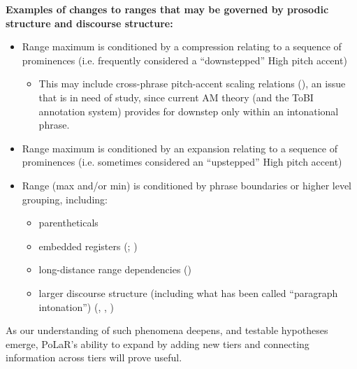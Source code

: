 \documentclass[11pt, twoside]{memoir}
\begin{document}
\textbf{Examples of changes to ranges that may be governed by prosodic structure and discourse structure:}
\begin{itemize}
	\item Range maximum is conditioned by a compression relating to a sequence of prominences (i.e. frequently considered a “downstepped” High pitch accent) 
	\begin{itemize}
		\item This may include cross-phrase pitch-accent scaling relations (\citealt{fery-05}), an issue that is in need of study, since current AM theory (and the ToBI annotation system) provides for downstep only within an intonational phrase. 
	\end{itemize}
	\item Range maximum is conditioned by an expansion relating to a sequence of prominences (i.e. sometimes considered an “upstepped” High pitch accent) 
	\item Range (max and/or min) is conditioned by phrase boundaries or higher level grouping, including:
	\begin{itemize}
		\item parentheticals
		\item embedded registers (\citealt{truckenbrodt02}; \citealt{dimperio-10})
		\item long-distance range dependencies (\citealt{ladd88})
		\item larger discourse structure (including what has been called “paragraph intonation”) (\citealt{lehiste75}, \citealt{sluijter-93}, \citealt{wichmann14})
	\end{itemize}
\end{itemize}

As our understanding of such phenomena deepens, and testable hypotheses emerge, PoLaR’s ability to expand by adding new tiers and connecting information across tiers will prove useful.




\end{document}
